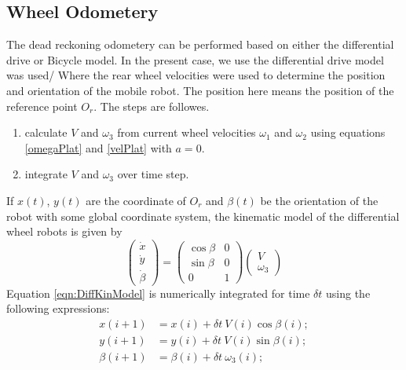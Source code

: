  

\subsection{Wheel Odometery }
The dead reckoning odometery can be performed based on either the differential drive or Bicycle model. In the present case, we use the differential drive model was used/ Where the rear wheel velocities were used to determine the position and orientation of the mobile robot. The position here means the position of the reference point $O_r$. The steps are followes.
\begin{enumerate}
	\item calculate $V$ and $\omega_3$ from current wheel velocities $\omega_1$  and  $\omega_2$  using equations \ref{omegaPlat} and \ref{velPlat} with $a=0$.
	\item integrate $V$ and $\omega_3$ over time step.
\end{enumerate}
If $x(t)$, $y(t)$ are the coordinate of $O_r$  and  $\beta(t)$ be the orientation of the robot with some global coordinate system, the kinematic model of the differential wheel robots is given by \cite{campion1996structural}  
\begin{equation}
\label{eqn:DiffKinModel}
\begin{pmatrix}
\dot{x}\\\dot{y}\\\dot{\beta}
\end{pmatrix}=
\begin{pmatrix}
\cos\beta & 0\\
\sin\beta & 0\\
0&1
\end{pmatrix}
\begin{pmatrix}
V\\\omega_3
\end{pmatrix}
\end{equation}
Equation \ref{eqn:DiffKinModel} is numerically integrated for time $\delta t$ using the following expressions:
\begin{align}
 x(i+1)&=x(i)+\delta t~ V(i)\cos\beta(i);\\
y(i+1)&=y(i)+\delta t~V(i)\sin\beta(i);\\
\beta(i+1)&=\beta(i)+\delta t~\omega_3(i);
\end{align}
